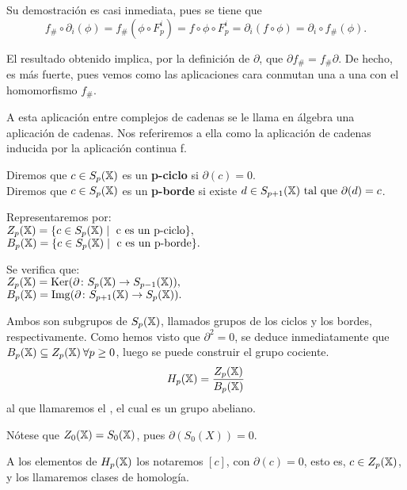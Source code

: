 Su demostración es casi inmediata, pues se tiene que
\[ f_\# \circ \partial_i(\phi) = f_\#(\phi \circ F_p^i) = f \circ \phi \circ F_p^i = \partial_i(f \circ \phi) = \partial_i \circ f_\#(\phi). \]

El resultado obtenido implica, por la definición de $\partial$, que $\partial f_\# = f_\# \partial$. De hecho, es más fuerte, pues vemos
como las aplicaciones cara conmutan una a una con el homomorfismo $f_\#$.

A esta aplicación entre complejos de cadenas se le llama en álgebra una aplicación de cadenas. Nos referiremos a ella como la aplicación de cadenas
inducida por la aplicación continua f.

\begin{definition}
  Diremos que $c \in S_p({\mathbb X})$ es un \textbf{p-ciclo} si $\partial(c) = 0$. \\
  Diremos que $c \in S_p({\mathbb X})$ es un \textbf{p-borde} si existe $d \in S_{p+1}({\mathbb X}) \text{ tal que } \partial(d) = c$.
\end{definition}

Representaremos por: \\
$Z_p({\mathbb X}) = \{c \in S_p({\mathbb X}) \mid \text{ c es un p-ciclo}\},$ \\
$B_p({\mathbb X}) = \{c \in S_p({\mathbb X}) \mid \text{ c es un p-borde}\}.$

Se verifica que: \\
$Z_p({\mathbb X}) = \operatorname{Ker} (\partial \colon S_p({\mathbb X}) \to S_{p-1}({\mathbb X})),$ \\
$B_p({\mathbb X}) = \operatorname{Img} (\partial \colon S_{p+1}({\mathbb X}) \to S_p({\mathbb X})).$

Ambos son subgrupos de $S_p({\mathbb X})$, llamados grupos de los ciclos y los bordes, respectivamente. Como hemos visto que $\partial^2 = 0$, se deduce
inmediatamente que $B_p({\mathbb X}) \subseteq Z_p({\mathbb X}) \hspace{0.2em}\forall p \geq 0$, luego se puede construir el grupo cociente.
\begin{equation*}
  H_p({\mathbb X}) = \frac{\displaystyle Z_p({\mathbb X})}{\displaystyle B_p({\mathbb X})}
\end{equation*}
al que llamaremos el \textbf{\underline{}}, el cual es un grupo abeliano.

\begin{remark}
  Nótese que $Z_0({\mathbb X}) = S_0({\mathbb X})$, pues $\partial(S_0(X)) = 0$.
\end{remark}

A los elementos de $H_p({\mathbb X})$ los notaremos $[c]$, con $\partial(c) = 0$, esto es, $c \in Z_p({\mathbb X})$, y los llamaremos clases de homología.

